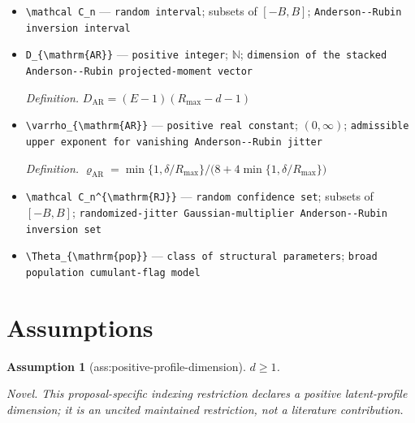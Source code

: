 \documentclass{article}
\newtheorem{assumption}{Assumption}
\begin{document}
\begin{itemize}
  \item \texttt{\textbackslash{}\allowbreak{}mathcal C\_\allowbreak{}n} --- \texttt{random interval}; subsets of \([-B,B]\); \texttt{Anderson-\allowbreak{}-\allowbreak{}Rubin inversion interval}
  \item \texttt{D\_\allowbreak{}\{\textbackslash{}\allowbreak{}mathrm\{AR\}\allowbreak{}\}\allowbreak{}} --- \texttt{positive integer}; \(\mathbb N\); \texttt{dimension of the stacked Anderson-\allowbreak{}-\allowbreak{}Rubin projected-\allowbreak{}moment vector}
  \par\smallskip\noindent\emph{Definition.} \(D_{\mathrm{AR}}=(E-1)(R_{\max}-d-1)\)
  \item \texttt{\textbackslash{}\allowbreak{}varrho\_\allowbreak{}\{\textbackslash{}\allowbreak{}mathrm\{AR\}\allowbreak{}\}\allowbreak{}} --- \texttt{positive real constant}; \((0,\infty)\); \texttt{admissible upper exponent for vanishing Anderson-\allowbreak{}-\allowbreak{}Rubin jitter}
  \par\smallskip\noindent\emph{Definition.} \(\varrho_{\mathrm{AR}}=\min\{1,\delta/R_{\max}\}/\bigl(8+4\min\{1,\delta/R_{\max}\}\bigr)\)
  \item \texttt{\textbackslash{}\allowbreak{}mathcal C\_\allowbreak{}n\textasciicircum{}\{\textbackslash{}\allowbreak{}mathrm\{RJ\}\allowbreak{}\}\allowbreak{}} --- \texttt{random confidence set}; subsets of \([-B,B]\); \texttt{randomized-\allowbreak{}jitter Gaussian-\allowbreak{}multiplier Anderson-\allowbreak{}-\allowbreak{}Rubin inversion set}
  \item \texttt{\textbackslash{}\allowbreak{}Theta\_\allowbreak{}\{\textbackslash{}\allowbreak{}mathrm\{pop\}\allowbreak{}\}\allowbreak{}} --- \texttt{class of structural parameters}; \texttt{broad population cumulant-\allowbreak{}flag model}
\end{itemize}

\section{Assumptions}

\begin{assumption}[ass:positive-profile-dimension]\label{ass:positive-profile-dimension}
\(d\ge1\).
\par\smallskip\noindent\emph{Novel.} This proposal-specific indexing restriction declares a positive latent-profile dimension; it is an uncited maintained restriction, not a literature contribution.
\end{assumption}
\end{document}

